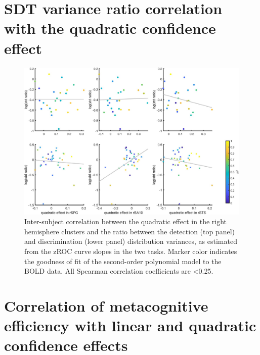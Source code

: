\documentclass[12pt,twoside]{reedthesis}
\begin{document}
\hypertarget{app3:varianceRat}{%
\section{SDT variance ratio correlation with the quadratic confidence effect}\label{app3:varianceRat}}
\begin{figure}
\includegraphics[width=\linewidth]{figure/ch3/varianceRatio} \caption[Inter-subject correlation between the quadratic effect in the right hemisphere clusters and the ratio between the detection and discrimination distribution variances]{Inter-subject correlation between the quadratic effect in the right hemisphere clusters and the ratio between the detection (top panel) and discrimination (lower panel) distribution variances, as estimated from the zROC curve slopes in the two tasks. Marker color indicates the goodness of fit of the second-order polynomial model to the BOLD data. All Spearman correlation coefficients are <0.25.}\label{fig:varianceRat}
\end{figure}
\hypertarget{app3:efficiency}{%
\section{Correlation of metacognitive efficiency with linear and quadratic confidence effects}\label{app3:efficiency}}
\end{document}
